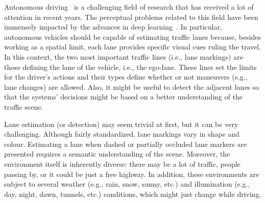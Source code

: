 \documentclass[a4paper,conference]{IEEEtran}
\begin{document}
Autonomous driving~\cite{badue2019arxiv} is a challenging field of research that has received a lot of attention in recent years. The perceptual problems related to this field have been immensely impacted by the advances in deep learning~\cite{possatti2019traffic,yang2020part,feng2020deep}. In particular, autonomous vehicles should be capable of estimating traffic lanes because, besides working as a spatial limit, each lane provides specific visual cues ruling the travel. In this context, the two most important traffic lines (i.e., lane markings) are those defining the lane of the vehicle, i.e., the ego-lane. These lines set the limits for the driver's actions and their types define whether or not maneuvers (e.g., lane changes) are allowed. Also, it might be useful to detect the adjacent lanes so that the systems' decisions might be based on a better understanding of the traffic scene.

Lane estimation (or detection) may seem trivial at first, but it can be very challenging. Although fairly standardized, lane markings vary in shape and colour. Estimating a lane when dashed or partially occluded lane markers are presented requires a semantic understanding of the scene. Moreover, the environment itself is inherently diverse: there may be a lot of traffic, people passing by, or it could be just a free highway. In addition, these environments are subject to several weather (e.g., rain, snow, sunny, etc.) and illumination (e.g., day, night, dawn, tunnels, etc.) conditions, which might just change while driving.
\end{document}
